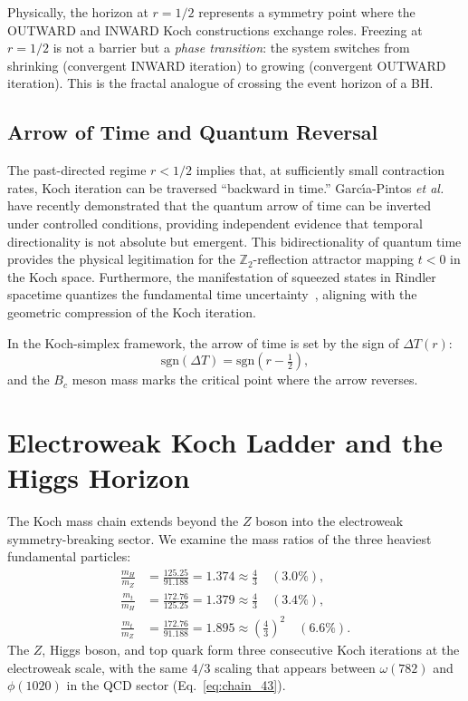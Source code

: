 \documentclass[twocolumn,showpacs,preprintnumbers,amsmath,amssymb,prl]{revtex4-2}
\begin{document}
Physically, the horizon at $r = 1/2$ represents a symmetry point
where the OUTWARD and INWARD Koch constructions exchange roles.
Freezing at $r = 1/2$ is not a barrier but a \emph{phase transition}:
the system switches from shrinking (convergent INWARD iteration) to
growing (convergent OUTWARD iteration). This is the fractal analogue
of crossing the event horizon of a BH.

\subsection{Arrow of Time and Quantum Reversal}

The past-directed regime $r < 1/2$ implies that, at sufficiently small
contraction rates, Koch iteration can be traversed ``backward in time.''
Garc\'{\i}a-Pintos \textit{et al.}~\cite{Garcia2026} have recently
demonstrated that the quantum arrow of time can be inverted under
controlled conditions, providing independent evidence that temporal
directionality is not absolute but emergent. This bidirectionality of
quantum time provides the physical legitimation for the $\mathbb{Z}_2$-reflection
attractor mapping $t < 0$ in the Koch space.
Furthermore, the manifestation of squeezed states in Rindler spacetime
quantizes the fundamental time uncertainty~\cite{Bortolotti2026,Pikovski2026},
aligning with the geometric compression of the Koch iteration.

In the Koch-simplex framework, the arrow of time is set by the sign of
$\Delta T(r)$:
\begin{equation}
    \text{sgn}(\Delta T) = \text{sgn}\!\left(r - \tfrac{1}{2}\right),
    \label{eq:arrow}
\end{equation}
and the $B_c$ meson mass marks the critical point where the arrow reverses.

\section{Electroweak Koch Ladder and the Higgs Horizon}
\label{sec:ew}

The Koch mass chain extends beyond the $Z$ boson into the electroweak
symmetry-breaking sector. We examine the mass ratios of the three heaviest
fundamental particles:
\begin{align}
    \frac{m_H}{m_Z} &= \frac{125.25}{91.188} = 1.374 \approx \frac{4}{3}
        \quad (3.0\%), \label{eq:HZ}\\
    \frac{m_t}{m_H} &= \frac{172.76}{125.25} = 1.379 \approx \frac{4}{3}
        \quad (3.4\%), \label{eq:tH}\\
    \frac{m_t}{m_Z} &= \frac{172.76}{91.188} = 1.895 \approx \left(\frac{4}{3}\right)^{\!2}
        \quad (6.6\%). \label{eq:tZ}
\end{align}
The $Z$, Higgs boson, and top quark form three consecutive Koch iterations
at the electroweak scale, with the same $4/3$ scaling that appears between
$\omega(782)$ and $\phi(1020)$ in the QCD sector (Eq.~\ref{eq:chain_43}).
\end{document}

